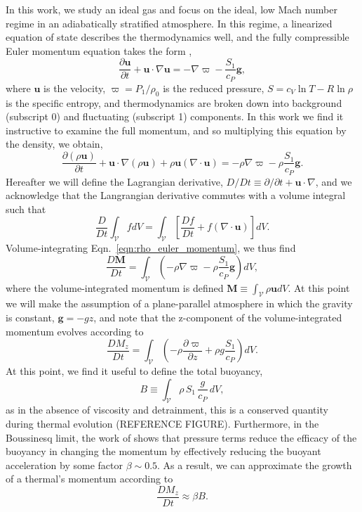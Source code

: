 \documentclass[twocolumn, amsmath, amsfonts, amssymb, trackchanges]{aastex62}
\newcommand{\DivU}{\ensuremath{\nabla\cdot\bm{u}}}
\newcommand{\grad}{\ensuremath{\nabla}}
\begin{document}
In this work, we study an ideal gas and focus on the ideal, low Mach number regime in an adiabatically stratified atmosphere. 
In this regime, a linearized equation of state describes the thermodynamics well, and the fully compressible Euler momentum equation takes the form \citep{brown&all2012},
\begin{equation}
\frac{\partial \bm{u}}{\partial t} + \bm{u}\cdot\grad\bm{u} = 
-\grad\varpi - \frac{S_1}{c_P}\bm{g},
\label{eqn:euler_momentum}
\end{equation}
where $\bm{u}$ is the velocity, $\varpi = P_1 / \rho_0$ is the reduced pressure, $S = c_V\ln T - R\ln\rho$ is the specific entropy, and thermodynamics are broken down into background (subscript 0) and fluctuating (subscript 1) components.
In this work we find it instructive to examine the full momentum, and so multiplying this equation by the density, we obtain,
\begin{equation}
\frac{\partial (\rho\bm{u})}{\partial t} + \bm{u}\cdot\grad(\rho\bm{u}) + \rho\bm{u}(\DivU)
= -\rho\grad\varpi - \rho\frac{S_1}{c_P}\bm{g}.
\label{eqn:rho_euler_momentum}
\end{equation}
Hereafter we will define the Lagrangian derivative, $D/Dt \equiv \partial/\partial t + \bm{u}\cdot\grad$, and we acknowledge that the Langrangian derivative commutes with a volume integral such that
\begin{equation*}
\frac{D}{Dt}\int_{\mathcal{V}} f dV = \int_{\mathcal{V}} \left[\frac{Df}{Dt} + f(\DivU)\right]dV.
\end{equation*}
Volume-integrating Eqn.~\ref{eqn:rho_euler_momentum}, we thus find
\begin{equation}
\frac{D\bm{M}}{Dt} = \int_{\mathcal{V}}\left(-\rho\grad\varpi - \rho\frac{S_1}{c_P}\bm{g}\right)dV,
\label{eqn:int_momentum_eqn}
\end{equation}
where the volume-integrated momentum is defined $\bm{M} \equiv \int_{\mathcal{V}}\rho\bm{u} dV$.
At this point we will make the assumption of a plane-parallel atmosphere in which the gravity is constant, $\bm{g} = -g\hat{z}$, and note that the z-component of the volume-integrated momentum evolves according to
\begin{equation}
\frac{D M_z}{Dt} = \int_{\mathcal{V}}\left( -\rho\frac{\partial \varpi}{\partial z} + \rho g \frac{S_1}{c_P} \right)dV.
\label{eqn:Mz_definition}
\end{equation}
At this point, we find it useful to define the total buoyancy,
\begin{equation}
B \equiv \int_{\mathcal{V}} \rho\, S_1\, \frac{g}{c_P}\, dV,
\label{eqn:tot_buoyancy}
\end{equation}
as in the absence of viscosity and detrainment, this is a conserved quantity during thermal evolution (REFERENCE FIGURE). 
Furthermore, in the Boussinesq limit, the work of \citet{tarshish&all2018} shows that pressure terms reduce the efficacy of the buoyancy in changing the momentum by effectively reducing the buoyant acceleration by some factor $\beta \sim 0.5$. 
As a result, we can approximate the growth of a thermal's momentum according to
\begin{equation}
\frac{D M_z}{Dt} \approx \beta B.
\label{eqn:theory_momentum}
\end{equation}
\end{document}
